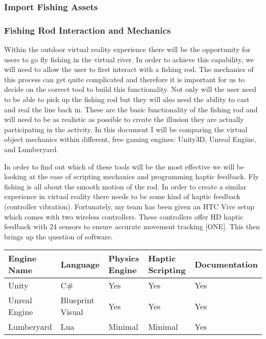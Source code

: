 \documentclass[10pt,journal,compsoc,onecolumn, draftclsnofoot]{IEEEtran}
\begin{document}
\subsubsection{Import Fishing Assets}

\subsubsection{Fishing Rod Interaction and Mechanics}
Within the outdoor virtual reality experience there will be the opportunity for users to go fly fishing in the virtual river. In order to achieve this capability, we will need to allow the user to first interact with a fishing rod. The mechanics of this process can get quite complicated and therefore it is important for us to decide on the correct tool to build this functionality. Not only will the user need to be able to pick up the fishing rod but they will also need the ability to cast and real the line back in. These are the basic functionality of the fishing rod and will need to be as realistic as possible to create the illusion they are actually participating in the activity. In this document I will be comparing the virtual object mechanics within different, free gaming engines: Unity3D, Unreal Engine, and Lumberyard.

In order to find out which of these tools will be the most effective we will be looking at the ease of scripting mechanics and programming haptic feedback. Fly fishing is all about the smooth motion of the rod. In order to create a similar experience in virtual reality there needs to be some kind of haptic feedback (controller vibration). Fortunately, my team has been given an HTC Vive setup which comes with two wireless controllers. These controllers offer HD haptic feedback with 24 sensors to ensure accurate movement tracking [ONE]. This then brings up the question of software.

\vspace{2mm}
\begin{table}[h!]
\centering
  \begin{tabu} to 1.0\textwidth { | X[l] || X[c] | X[c] | X[c] | X[c] |  }
  \hline
  Engine Name & Language & Physics Engine & Haptic Scripting & Documentation\\
  \hline
  Unity  & C\# & Yes & Yes & Yes\\
  Unreal Engine &   Blueprint Visual  & Yes & Yes & Yes\\
  Lumberyard & Lua & Minimal & Minimal & Yes \\
  \hline
  \end{tabu}
\end{table}
\vspace{2mm}
\end{document}
